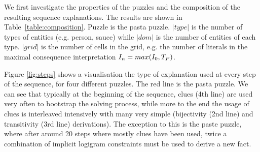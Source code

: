 We first investigate the properties of the puzzles and the composition of the resulting sequence explanations. The results are shown in Table~\ref{table:composition}. Puzzle  is the pasta puzzle. $|type|$ is the number of types of entities (e.g. person, sauce) while $|dom|$ is the number of entities of each type. $|grid|$ is the number of cells in the grid, e.g. the number of literals in the maximal consequence interpretation $I_n=max(I_0,T_P)$.


Figure \ref{fig:steps} shows a visualisation the type of explanation used at every step of the sequence, for four different puzzles. The red line is the pasta puzzle. We can see that typically at the beginning of the sequence, clues (4th line)  are used very often to bootstrap the solving process, while more to the end the usage of clues is interleaved intensively with many very simple (bijectivity (2nd line) and transitivity (3rd line) derivations).
% 
The exception to this is the paste puzzle, where after around 20 steps where mostly clues have been used, twice a combination of implicit logigram constraints must be used to derive a new fact. %

